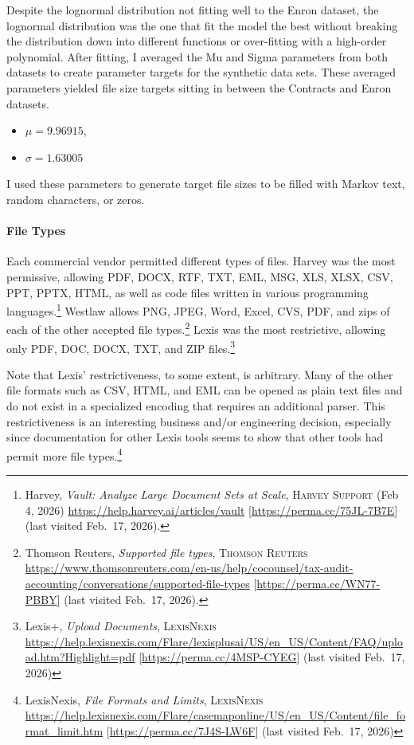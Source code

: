 \documentclass[
]{article}
\providecommand{\tightlist}{%
  \setlength{\itemsep}{0pt}\setlength{\parskip}{0pt}}
\begin{document}
Despite the lognormal distribution not fitting well to the Enron dataset, the lognormal distribution was the one that fit the model the best without breaking the distribution down into different functions or over-fitting with a high-order polynomial. After fitting, I averaged the Mu and Sigma parameters from both datasets to create parameter targets for the synthetic data sets. These averaged parameters yielded file size targets sitting in between the Contracts and Enron datasets.

\begin{itemize}
\tightlist
\item
  \(\mu = 9.96915\),
\item
  \(\sigma = 1.63005\)
\end{itemize}

I used these parameters to generate target file sizes to be filled with Markov text, random characters, or zeros.

\paragraph{File Types}\label{file-types}

Each commercial vendor permitted different types of files. Harvey was the most permissive, allowing PDF, DOCX, RTF, TXT, EML, MSG, XLS, XLSX, CSV, PPT, PPTX, HTML, as well as code files written in various programming languages.\footnote{Harvey, \emph{Vault: Analyze Large Document Sets at Scale}, \textsc{Harvey Support} (Feb 4, 2026) \url{https://help.harvey.ai/articles/vault} {[}\url{https://perma.cc/75JL-7B7E}{]} (last visited Feb.~17, 2026).} Westlaw allows PNG, JPEG, Word, Excel, CVS, PDF, and zips of each of the other accepted file types.\footnote{Thomson Reuters, \emph{Supported file types}, \textsc{Thomson Reuters} \url{https://www.thomsonreuters.com/en-us/help/cocounsel/tax-audit-accounting/conversations/supported-file-types} {[}\url{https://perma.cc/WN77-PBBY}{]} (last visited Feb.~17, 2026).} Lexis was the most restrictive, allowing only PDF, DOC, DOCX, TXT, and ZIP files.\footnote{Lexis+, \emph{Upload Documents}, \textsc{LexisNexis} \url{https://help.lexisnexis.com/Flare/lexisplusai/US/en_US/Content/FAQ/upload.htm?Highlight=pdf} {[}\url{https://perma.cc/4MSP-CYEG}{]} (last visited Feb.~17, 2026)}

Note that Lexis' restrictiveness, to some extent, is arbitrary. Many of the other file formats such as CSV, HTML, and EML can be opened as plain text files and do not exist in a specialized encoding that requires an additional parser. This restrictiveness is an interesting business and/or engineering decision, especially since documentation for other Lexis tools seems to show that other tools had permit more file types.\footnote{LexisNexis, \emph{File Formats and Limits}, \textsc{LexisNexis} \url{https://help.lexisnexis.com/Flare/casemaponline/US/en_US/Content/file_format_limit.htm} {[}\url{https://perma.cc/7J4S-LW6F}{]} (last visited Feb.~17, 2026)}
\end{document}
